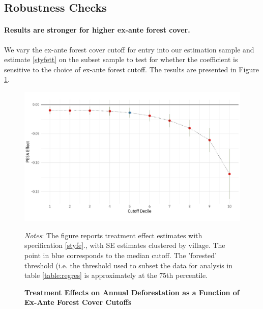 \documentclass[12pt,reqno]{article}
\begin{document}
\subsection{Robustness Checks}

\paragraph*{Results are stronger for higher ex-ante forest cover.} We vary the ex-ante forest cover cutoff for entry into our estimation sample and estimate \ref{styfett}
on the subset sample to test for whether the coefficient is sensitive to the choice of ex-ante forest cutoff. The results are presented in Figure
\ref{fig:cutoff_plot}. 

\begin{figure}[htbp!]
\begin{center}
\begin{minipage}{1 \linewidth}
\caption{\textbf{Treatment Effects on Annual Deforestation as a Function of Ex-Ante Forest Cover Cutoffs}\label{fig:cutoff_plot}} 	
\centerline{\includegraphics[width=5 in,angle=0]{Output/varying_cutoff2.pdf}}
\smallskip
\normalsize
\emph{Notes}: The figure reports treatment effect estimates with specification \ref{styfe}., with SE estimates clustered by village. The point in blue corresponds to the median cutoff. The 'forested' threshold (i.e. the threshold used to subset the data for analysis in table \ref{table:regres} is approximately at the 75th percentile.
\end{minipage}
\end{center}
\end{figure}
\end{document}
